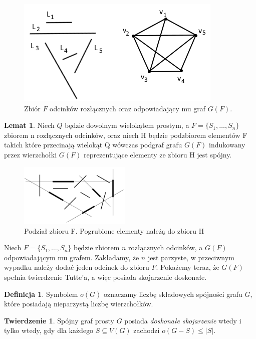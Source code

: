\documentclass[brudnopis]{xmgr}
\theoremstyle{definition}
\newtheorem{Twierdzenie}{Twierdzenie}
\newtheorem{Lemat}{Lemat}
\newtheorem{Definicja}{Definicja}
\begin{document}
\begin{figure}[ht!]\label{zbior odcinkow rozlacznych}
 \centering
  \includegraphics{rysunki/g_f.png}
  \caption{Zbiór $F$ odcinków rozłącznych oraz odpowiadający mu graf $G(F)$.}
\end{figure} 

\begin{Lemat}\label{podgraf indukowany} \cite{illumination}
Niech $Q$ będzie dowolnym wielokątem prostym, a $F = \{S_1,\ldots,S_n\}$ zbiorem n rozłącznych odcinków, oraz niech H będzie podzbiorem elementów F takich które przecinają wielokąt Q wówczas podgraf grafu $G(F)$ indukowany przez wierzchołki $G(F)$ reprezentujące elementy ze zbioru H jest spójny.
\end{Lemat}
\begin{figure}[ht!]
 \centering
  \includegraphics[height=3cm]{rysunki/podzial_h.png}
  \caption{Podział zbioru F. Pogrubione elementy należą do zbioru H}
\end{figure} 
Niech $F = \{S_1,\ldots,S_n\}$ będzie zbiorem $n$ rozłącznych odcinków, a $G(F)$ odpowiadającym mu grafem. Zakładamy, że $n$ jest parzyste, w przeciwnym wypadku należy dodać jeden odcinek do zbioru $F$. Pokażemy teraz, że $G(F)$ spełnia twierdzenie Tutte'a, a więc posiada skojarzenie doskonałe.
\begin{Definicja}
	Symbolem $o(G)$ oznaczamy liczbę składowych spójności grafu $G$, które posiadają nieparzystą liczbę wierzchołków.
\end{Definicja}
\begin{Twierdzenie} \cite{tutte}
	Spójny graf prosty $G$ posiada \emph{doskonałe skojarzenie} wtedy i tylko wtedy, gdy dla każdego $S \subseteq V(G)$ zachodzi $o(G-S) \le |S|$.
\end{Twierdzenie}
\end{document}
